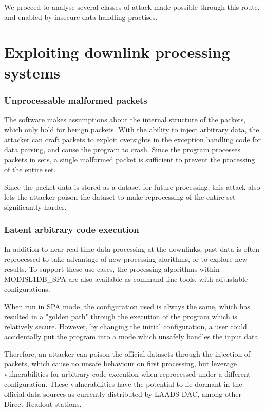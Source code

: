 We proceed to analyse several classes of attack made possible through this route, and enabled by insecure data handling practises.


\section{Exploiting downlink processing systems}

\subsubsection{Unprocessable malformed packets}

The software makes assumptions about the internal structure of the packets, which only hold for benign packets.
With the ability to inject arbitrary data, the attacker can craft packets to exploit oversights in the exception handling code for data parsing, and cause the program to crash.
Since the program processes packets in sets, a single malformed packet is sufficient to prevent the processing of the entire set.

Since the packet data is stored as a dataset for future processing, this attack also lets the attacker poison the dataset to make reprocessing of the entire set significantly harder.


\subsubsection{Latent arbitrary code execution}

In addition to near real-time data processing at the downlinks, past data is often reprocessed to take advantage of new processing alorithms, or to explore new results.
To support these use cases, the processing algorithms within MODISL1DB\_SPA are also available as command line tools, with adjustable configurations.

When run in SPA mode, the configuration used is always the same, which has resulted in a "golden path" through the execution of the program which is relatively secure.
However, by changing the initial configuration, a user could accidentally put the program into a mode which unsafely handles the input data.

Therefore, an attacker can poison the official datasets through the injection of packets, which cause no unsafe behaviour on first processing, but leverage vulnerabilities for arbitrary code execution when reprocessed under a different configuration.
These vulnerabilities have the potential to lie dormant in the official data sources as currently distributed by LAADS DAC, among other Direct Readout stations.

